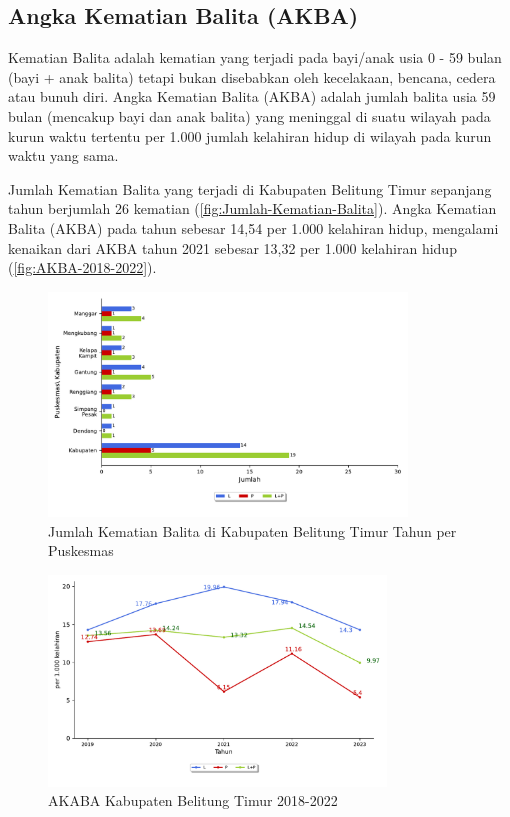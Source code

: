 \subsection{Angka Kematian Balita (AKBA)}
Kematian Balita adalah kematian yang terjadi pada bayi/anak usia 0 - 59 bulan (bayi + anak balita) tetapi bukan disebabkan oleh kecelakaan, bencana, cedera atau bunuh diri. Angka Kematian Balita (AKBA) adalah jumlah balita usia 59 bulan (mencakup bayi dan anak balita) yang meninggal di suatu wilayah pada kurun waktu tertentu
per 1.000 jumlah kelahiran hidup di wilayah pada kurun waktu yang sama.

Jumlah Kematian Balita yang terjadi di Kabupaten Belitung Timur sepanjang tahun \tP berjumlah 26 kematian (\autoref{fig:Jumlah-Kematian-Balita}). Angka Kematian Balita (AKBA) pada tahun \tP sebesar 14,54 per 1.000 kelahiran hidup, mengalami kenaikan dari AKBA tahun 2021 sebesar 13,32 per 1.000 kelahiran hidup (\autoref{fig:AKBA-2018-2022}).

\begin{figure}[H]
    \centering{}
    \includegraphics[width=0.85\textwidth]{bab_05/bab_05_11_kematianBalita}
    \caption{Jumlah Kematian Balita di Kabupaten Belitung Timur Tahun \tP per Puskesmas}
    \label{fig:Jumlah-Kematian-Balita}
\end{figure}

\begin{figure}[H]
    \centering{}
    \includegraphics[width=0.8\textwidth]{bab_05/bab_05_11_plotBalita}
    \caption{AKABA Kabupaten Belitung Timur 2018-2022}
    \label{fig:AKBA-2018-2022}
\end{figure}

